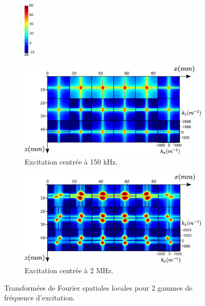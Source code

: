 \begin{figure}[!h]
    \centering
    \begin{subfigure}[b]{0.05\textwidth}
 		\hspace{-2cm}\includegraphics[width=0.5cm]{img/echelle_fft.png}\vspace{2.1cm}
	\end{subfigure}
    \begin{subfigure}[b]{0.4\textwidth}
		\hspace{-3cm}\includegraphics[width=1.5\textwidth]{img/ssfreesurf_150k}
		\caption{Excitation centrée à 150 kHz.}
		\label{app:150k}
	\end{subfigure}	
	\begin{subfigure}[b]{0.4\textwidth}
		\includegraphics[width=1.5\textwidth]{img/fft2d_nofreesurf_2MHz.png}
		\caption{Excitation centrée à 2 MHz.}
		\label{app:2M}
	\end{subfigure}
	\caption{Transformées de Fourier spatiales locales pour 2 gammes de fréquence d'excitation.}
\end{figure}

